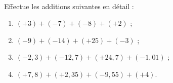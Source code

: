 \begin{exercice}
\begin{minipage}[c]{0.48\linewidth}
\begin{center} \boxed{\phantom{hello}} \end{center}
\vspace{-0.69cm}
\begin{center}  \negthinspace \boxed{\phantom{hello}} \end{center}
\vspace{-0.71cm}
\begin{center} \boxed{\phantom{hello}} \negthinspace {} \negthinspace  \boxed{\phantom{hello}} \end{center}
\vspace{-0.71cm}
\begin{center} \negthinspace \boxed{\phantom{hello}} \negthinspace {} \negthinspace \boxed{\phantom{hello}} \negthinspace {} \end{center}
 \end{minipage} \hfill%
 \begin{minipage}[c]{0.48\linewidth}
\begin{center}  \end{center}
\vspace{-0.69cm}
\begin{center}  \negthinspace \boxed{\phantom{hello}} \end{center}
\vspace{-0.71cm}
\begin{center} \boxed{\phantom{hello}} \negthinspace {} \negthinspace \boxed{\phantom{hello}} \end{center}
\vspace{-0.71cm}
\begin{center} \boxed{\phantom{hello}} \negthinspace \boxed{\phantom{hello}} \negthinspace \boxed{\phantom{hello}} \negthinspace {} \end{center}
  \end{minipage} \\
\end{exercice}


\begin{exercice}
Effectue les additions suivantes en détail :
\begin{enumerate}
 \item $(+ 3) + (- 7) + (- 8) + (+ 2)$ ;
 \item $(- 9) + (- 14) + (+ 25) + (- 3)$ ;
 \item $(- 2,3) + (- 12,7) + (+ 24,7) + (- 1,01)$ ;
 \item $(+ 7,8) + (+ 2,35) + (- 9,55) + (+ 4)$.
 \end{enumerate}
\end{exercice}


